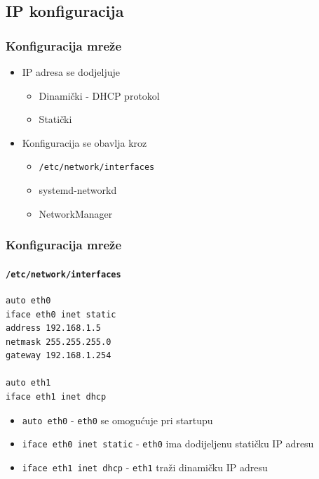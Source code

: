 \documentclass[t,table,usenames,dvipsnames]{beamer}
\begin{document}
\subsection{IP konfiguracija}
\begin{frame}
	\frametitle{Konfiguracija mreže}
	\begin{itemize}
		\item IP adresa se dodjeljuje
		\begin{itemize}
			\item Dinamički - DHCP protokol
			\item Statički
		\end{itemize}
		\item Konfiguracija se obavlja kroz
		\begin{itemize}
			\item \texttt{/etc/network/interfaces}
			\item systemd-networkd
			\item NetworkManager
		\end{itemize}
	\end{itemize}
\end{frame}

\begin{frame}[fragile]
	\frametitle{Konfiguracija mreže}
	\framesubtitle{\texttt{/etc/network/interfaces}}
	\vspace{-1em}
	\begin{verbatim}
auto eth0
iface eth0 inet static
address 192.168.1.5
netmask 255.255.255.0
gateway 192.168.1.254

auto eth1
iface eth1 inet dhcp
	\end{verbatim}
	\begin{itemize}
		\item \texttt{auto eth0} - \texttt{eth0} se omogućuje pri startupu
		\item \texttt{iface eth0 inet static} - \texttt{eth0} ima dodijeljenu statičku IP adresu
		\item \texttt{iface eth1 inet dhcp} - \texttt{eth1} traži dinamičku IP adresu
	\end{itemize}
\end{frame}
\end{document}
